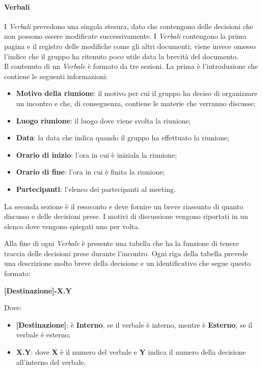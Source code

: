 \paragraph{Verbali}
I \textit{Verbali} prevedono una singola stesura, dato che contengono delle decisioni che non possono essere modificate successivamente. I \textit{Verbali} contengono la prima pagina e il registro delle modifiche come gli altri documenti; viene invece omesso l'indice che il gruppo ha ritenuto poco utile data la brevità del documento.\\ Il contenuto di un \textit{Verbale} è formato da tre sezioni. La prima è l'introduzione che contiene le seguenti informazioni:
\begin{itemize}
	
	\item \textbf{Motivo della riunione}: il motivo per cui il gruppo ha deciso di organizzare un incontro e che, di conseguenza, contiene le materie che verranno discusse;
	
	\item \textbf{Luogo riunione}: il luogo dove viene svolta la riunione;
	
	\item \textbf{Data}: la data che indica quando il gruppo ha effettuato la riunione;
	
	\item \textbf{Orario di inizio}: l'ora in cui è iniziala la riunione;
	
	\item \textbf{Orario di fine}: l'ora in cui è finita la riunione;
	
	\item \textbf{Partecipanti}: l'elenco dei partecipanti al meeting.
\end{itemize}

La seconda sezione è il resoconto e deve fornire un breve riassunto di quanto discusso e delle decisioni prese. I motivi di discussione vengono riportati in un elenco dove vengono spiegati uno per volta.

Alla fine di ogni \textit{Verbale} è presente una tabella che ha la funzione di tenere traccia delle decisioni prese durante l'incontro. Ogni riga della tabella prevede una descrizione molto breve della decisione e un identificativo che segue questo formato:
\begin{center}
\textbf{[Destinazione]-X.Y}
\end{center}
Dove: 

\begin{itemize}

	\item \textbf{[Destinazione]}: è \textbf{Interno}, se il verbale è interno, mentre è \textbf{Esterno}, se il verbale è esterno;
	
	\item \textbf{X.Y}: dove \textbf{X} è il numero del verbale e \textbf{Y} indica il numero della decisione all'interno del verbale.
\end{itemize}

